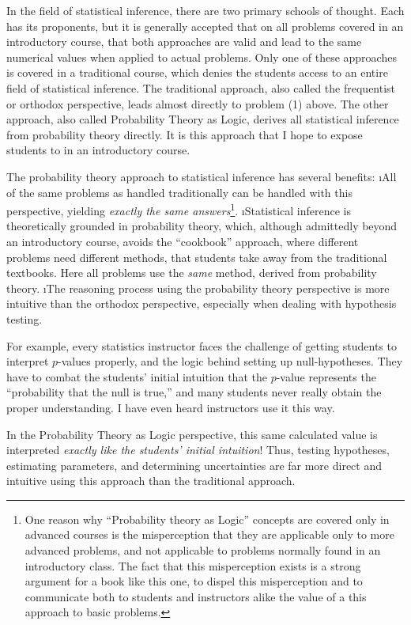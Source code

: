 In the field of statistical inference, there are two primary schools of thought.  Each has its proponents, but it is generally accepted that on all problems covered in an introductory course, that both approaches are valid and lead to the same numerical values when applied to actual problems.  Only one of these approaches is covered in a traditional course, which denies the students access to an entire field of statistical inference.  The traditional approach, also called the frequentist or orthodox perspective, leads almost directly to problem (1) above.  The other approach, also called Probability Theory as Logic\cite{Jaynes2003}, derives all statistical inference from probability theory directly.  It is this approach that I hope to expose students to in an introductory course.

The probability theory approach to statistical inference has several benefits:
\be
\i All of the same problems as handled traditionally can be handled with this perspective, yielding {\em exactly the same answers}\footnote{One reason why ``Probability theory as Logic'' concepts are covered only in advanced courses is the misperception that they are applicable only to more advanced problems, and not applicable to problems normally found in an introductory class.  The fact that this misperception exists is a strong argument for a book like this one, to dispel this misperception and to communicate both to students and instructors alike the value of a this approach to basic problems.}.
\i Statistical inference is theoretically grounded in probability theory, which, although admittedly beyond an introductory course, avoids the ``cookbook'' approach, where different problems need different methods, that students take away from the traditional textbooks.  Here all problems use the \emph{same} method, derived from probability theory.
\i The reasoning process using the probability theory perspective is more intuitive than the orthodox perspective, especially when dealing with hypothesis testing. 

For example, every statistics instructor faces the challenge of getting students to interpret $p$-values properly, and the logic behind setting up null-hypotheses.  They have to combat the students' initial intuition that the $p$-value represents the ``probability that the null is true,'' and many students never really obtain the proper understanding.  I have even heard instructors use it this way.

In the Probability Theory as Logic perspective, this same calculated value is interpreted {\em exactly like the students' initial intuition}!  Thus, testing hypotheses, estimating parameters, and determining uncertainties are far more direct and intuitive using this approach than the traditional approach.
\ee


